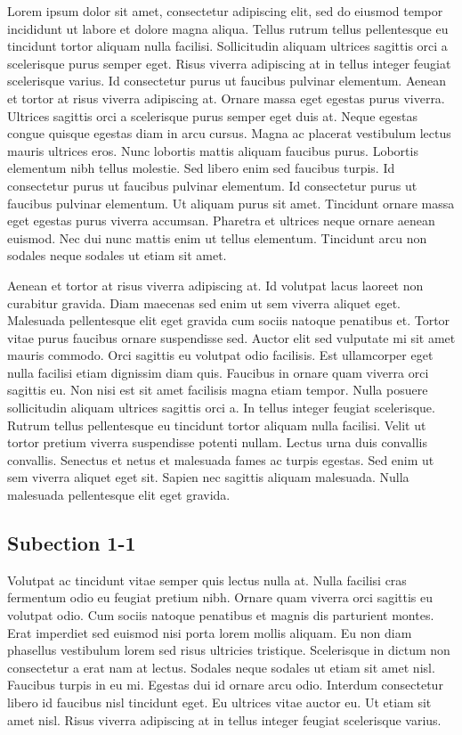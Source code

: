 \documentclass[
  letterpaper,
  DIV=11,
  numbers=noendperiod,
  oneside]{scrreprt}
\begin{document}
Lorem ipsum dolor sit amet, consectetur adipiscing elit, sed do eiusmod
tempor incididunt ut labore et dolore magna aliqua. Tellus rutrum tellus
pellentesque eu tincidunt tortor aliquam nulla facilisi. Sollicitudin
aliquam ultrices sagittis orci a scelerisque purus semper eget. Risus
viverra adipiscing at in tellus integer feugiat scelerisque varius. Id
consectetur purus ut faucibus pulvinar elementum. Aenean et tortor at
risus viverra adipiscing at. Ornare massa eget egestas purus viverra.
Ultrices sagittis orci a scelerisque purus semper eget duis at. Neque
egestas congue quisque egestas diam in arcu cursus. Magna ac placerat
vestibulum lectus mauris ultrices eros. Nunc lobortis mattis aliquam
faucibus purus. Lobortis elementum nibh tellus molestie. Sed libero enim
sed faucibus turpis. Id consectetur purus ut faucibus pulvinar
elementum. Id consectetur purus ut faucibus pulvinar elementum. Ut
aliquam purus sit amet. Tincidunt ornare massa eget egestas purus
viverra accumsan. Pharetra et ultrices neque ornare aenean euismod. Nec
dui nunc mattis enim ut tellus elementum. Tincidunt arcu non sodales
neque sodales ut etiam sit amet.

Aenean et tortor at risus viverra adipiscing at. Id volutpat lacus
laoreet non curabitur gravida. Diam maecenas sed enim ut sem viverra
aliquet eget. Malesuada pellentesque elit eget gravida cum sociis
natoque penatibus et. Tortor vitae purus faucibus ornare suspendisse
sed. Auctor elit sed vulputate mi sit amet mauris commodo. Orci sagittis
eu volutpat odio facilisis. Est ullamcorper eget nulla facilisi etiam
dignissim diam quis. Faucibus in ornare quam viverra orci sagittis eu.
Non nisi est sit amet facilisis magna etiam tempor. Nulla posuere
sollicitudin aliquam ultrices sagittis orci a. In tellus integer feugiat
scelerisque. Rutrum tellus pellentesque eu tincidunt tortor aliquam
nulla facilisi. Velit ut tortor pretium viverra suspendisse potenti
nullam. Lectus urna duis convallis convallis. Senectus et netus et
malesuada fames ac turpis egestas. Sed enim ut sem viverra aliquet eget
sit. Sapien nec sagittis aliquam malesuada. Nulla malesuada pellentesque
elit eget gravida.

\hypertarget{subection-1-1}{%
\subsection{Subection 1-1}\label{subection-1-1}}

Volutpat ac tincidunt vitae semper quis lectus nulla at. Nulla facilisi
cras fermentum odio eu feugiat pretium nibh. Ornare quam viverra orci
sagittis eu volutpat odio. Cum sociis natoque penatibus et magnis dis
parturient montes. Erat imperdiet sed euismod nisi porta lorem mollis
aliquam. Eu non diam phasellus vestibulum lorem sed risus ultricies
tristique. Scelerisque in dictum non consectetur a erat nam at lectus.
Sodales neque sodales ut etiam sit amet nisl. Faucibus turpis in eu mi.
Egestas dui id ornare arcu odio. Interdum consectetur libero id faucibus
nisl tincidunt eget. Eu ultrices vitae auctor eu. Ut etiam sit amet
nisl. Risus viverra adipiscing at in tellus integer feugiat scelerisque
varius.
\end{document}
